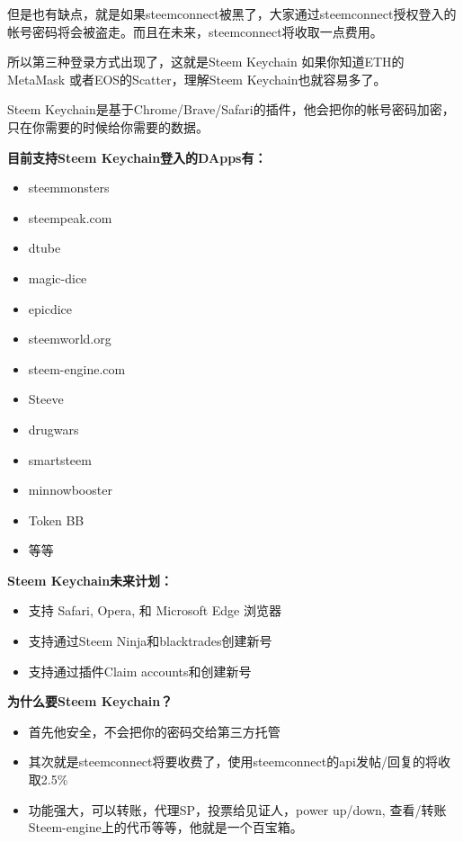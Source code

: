 \documentclass[]{ctexbook}
\providecommand{\tightlist}{%
  \setlength{\itemsep}{0pt}\setlength{\parskip}{0pt}}
\begin{document}
但是也有缺点，就是如果steemconnect被黑了，大家通过steemconnect授权登入的帐号密码将会被盗走。而且在未来，steemconnect将收取一点费用。

所以第三种登录方式出现了，这就是Steem Keychain 如果你知道ETH的MetaMask 或者EOS的Scatter，理解Steem Keychain也就容易多了。

Steem Keychain是基于Chrome/Brave/Safari的插件，他会把你的帐号密码加密，只在你需要的时候给你需要的数据。

\textbf{目前支持Steem Keychain登入的DApps有：}

\begin{itemize}
\tightlist
\item
  steemmonsters
\item
  steempeak.com
\item
  dtube
\item
  magic-dice
\item
  epicdice
\item
  steemworld.org
\item
  steem-engine.com
\item
  Steeve
\item
  drugwars
\item
  smartsteem
\item
  minnowbooster
\item
  Token BB
\item
  等等
\end{itemize}

\textbf{Steem Keychain未来计划：}

\begin{itemize}
\tightlist
\item
  支持 Safari, Opera, 和 Microsoft Edge 浏览器
\item
  支持通过Steem Ninja和blacktrades创建新号
\item
  支持通过插件Claim accounts和创建新号
\end{itemize}

\textbf{为什么要Steem Keychain？}

\begin{itemize}
\tightlist
\item
  首先他安全，不会把你的密码交给第三方托管
\item
  其次就是steemconnect将要收费了，使用steemconnect的api发帖/回复的将收取2.5\%
\item
  功能强大，可以转账，代理SP，投票给见证人，power up/down, 查看/转账Steem-engine上的代币等等，他就是一个百宝箱。
\end{itemize}
\end{document}
